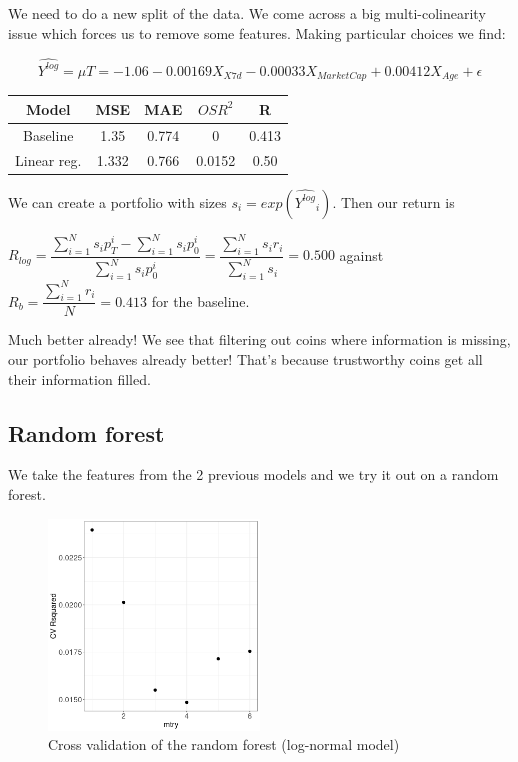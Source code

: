 \documentclass[11pt, english, letterpaper]{article}
\begin{document}
We need to do a new split of the data.
We come across a big multi-colinearity issue which forces us to remove some features. Making particular choices we find:

$$\hat{Y^{log}} = \mu T = -1.06 -0.00169 X_{X7d} -0.00033 X_{Market Cap} + 0.00412 X_{Age} + \epsilon$$

\begin{center}
    \begin{tabular}{c|cccc}
    Model & MSE & MAE & $OSR^2$ & R\\
          \hline
    Baseline & 1.35 & 0.774 & 0 & 0.413\\
    Linear reg. & 1.332  & 0.766 & 0.0152 & 0.50\\
    \end{tabular}
\end{center}

We can create a portfolio with sizes $s_i = exp(\hat{Y^{log}}_i)$.
Then our return is 

$R_{log} = \dfrac{\sum_{i=1}^N s_i p_T^i - \sum_{i=1}^N s_i p_0^i}{ \sum_{i=1}^N s_i p_0^i} = \dfrac{\sum_{i=1}^N s_i r_i}{\sum_{i=1}^N s_i} = 0.500$ against $R_b = \dfrac{\sum_{i=1}^N r_i}{N} = 0.413$ for the baseline.

Much better already! We see that filtering out coins where information is missing, our portfolio behaves already better! That's because trustworthy coins get all their information filled.

\subsection{Random forest}

We take the features from the 2 previous models and we try it out on a random forest.

\begin{figure}[!h]
    \centering
    \includegraphics[width=0.5\textwidth]{CV_R2_RF}
    \caption{Cross validation of the random forest (log-normal model)}
\end{figure}
\end{document}
